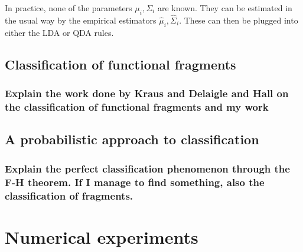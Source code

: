 \documentclass[10pt, a4paper]{report}
\theoremstyle{definition}
\theoremstyle{remark}
\begin{document}
In practice, none of the parameters $\mu_i,\Sigma_i$ are known. They can be estimated in the usual way by the empirical estimators $\hat{\mu}_i,\hat{\Sigma}_i$. These can then be plugged into either the LDA or QDA rules. 


\section{Classification of functional fragments}
\subsection{Explain the work done by Kraus and Delaigle and Hall on the classification of functional fragments and my work}
\section{A probabilistic approach to classification}
\subsection{Explain the perfect classification phenomenon through the F-H theorem. If I manage to find something, also the classification of fragments.}

\chapter{Numerical experiments}









 

\end{document}
